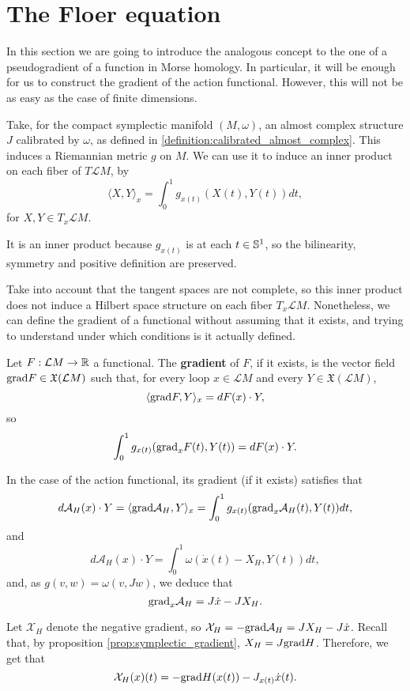 \section{The Floer equation}

In this section we are going to introduce the analogous concept to the one of a pseudogradient of a function in Morse homology. In particular, it will be enough for us to construct the gradient of the action functional. However, this will not be as easy as the case of finite dimensions.

Take, for the compact symplectic manifold $(M,\omega)$, an almost complex structure $J$ calibrated by $\omega$, as defined in \ref{definition:calibrated_almost_complex}. This induces a Riemannian metric $g$ on $M$. We can use it to induce an inner product on each fiber of $T\mathcal{L}M$, by
\[\langle X, Y \rangle_x = \int_0^1 g_{x(t)} (X(t), Y(t)) d t,\]
for $X,Y \in T_x\mathcal{L}M$.

It is an inner product because $g_{x(t)}$ is at each $t \in \mathbb{S}^1$, so the bilinearity, symmetry and positive definition are preserved.

Take into account that the tangent spaces are not complete, so this inner product does not induce a Hilbert space structure on each fiber $T_x\mathcal{L}M$. Nonetheless, we can define the gradient of a functional without assuming that it exists, and trying to understand under which conditions is it actually defined.

\begin{deff}
Let $F : \mathcal{L}M \rightarrow \mathbb{R}$ a functional. The {\bf gradient} of $F$, if it exists, is the vector field $\mathrm{grad} F \in \mathfrak{X}(\mathcal{L}M)$ such that, for every loop $x \in \mathcal{L}M$ and every $Y \in \mathfrak{X}(\mathcal{L}M)$,
\[\langle \mathrm{grad} F, Y \rangle_x = d F(x) \cdot Y ,\]
so
\[\int_0^1 g_{x(t)}(\mathrm{grad}_xF(t),Y(t)) = d F(x) \cdot Y .\]
\end{deff}

In the case of the action functional, its gradient (if it exists) satisfies that
\[d \mathcal{A}_H(x) \cdot Y = \langle \mathrm{grad}\mathcal{A}_H, Y \rangle_x = \int_0^1 g_{x(t)}(\mathrm{grad}_x\mathcal{A}_H(t),Y(t)) d t ,\]
and
\[d \mathcal{A}_H(x) \cdot Y = \int_0^1 \omega(\dot{x}(t)-X_H,Y(t)) d t ,\]
and, as $g(v,w) = \omega(v,Jw)$, we deduce that
\[\mathrm{grad}_x\mathcal{A}_H = J\dot{x} - J X_H .\]

Let $\mathcal{X}_H$ denote the negative gradient, so $\mathcal{X}_H = - \mathrm{grad}\mathcal{A}_H = J X_H - J \dot{x}$. Recall that, by proposition \ref{prop:symplectic_gradient}, $X_H = J \mathrm{grad} H$. Therefore, we get that
\[\mathcal{X}_H(x)(t) = - \mathrm{grad} H(x(t)) - J_{x(t)} \dot{x}(t) .\]

